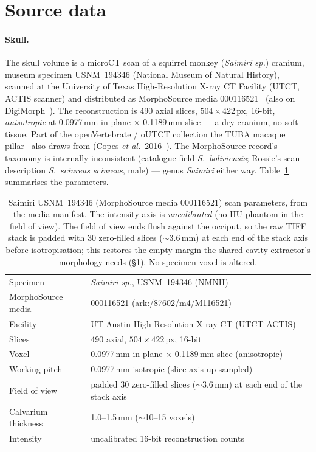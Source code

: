 \documentclass{compactarticle}
\providecommand{\br}{\toprule}
\providecommand{\mr}{\midrule}
\begin{document}
\section{Source data}
\label{sec:source}

\paragraph{Skull.} The skull volume is a microCT scan of a squirrel
monkey (\emph{Saimiri sp.}) cranium, museum specimen USNM~194346
(National Museum of Natural History), scanned at the University of Texas
High-Resolution X-ray CT Facility (UTCT, ACTIS scanner) and distributed
as MorphoSource media 000116521~\cite{morphosource-saimiri} (also on
DigiMorph~\cite{digimorph-saimiri}). The reconstruction is 490 axial
slices, $504\times422$\,px, 16-bit, \emph{anisotropic} at 0.0977\,mm
in-plane $\times$ 0.1189\,mm slice --- a dry cranium, no soft tissue.
Part of the openVertebrate / oUTCT collection the TUBA macaque
pillar~\cite{tuba-macaque} also draws from (Copes \emph{et
al.}\ 2016~\cite{copes-2016}). The MorphoSource record's taxonomy is
internally inconsistent (catalogue field \emph{S.~boliviensis};
Rossie's scan description \emph{S.~sciureus sciureus}, male) --- genus
\emph{Saimiri} either way. Table~\ref{tab:scan-params} summarises the
parameters.

\begin{table}[H]
\centering
\caption{Saimiri USNM~194346 (MorphoSource media 000116521) scan
         parameters, from the media manifest. The intensity axis is
         \emph{uncalibrated} (no HU phantom in the field of view).
         The field of view ends flush against the occiput, so the
         raw TIFF stack is padded with 30 zero-filled slices
         ($\sim$3.6\,mm) at each end of the stack axis before
         isotropisation; this restores the empty margin the shared
         cavity extractor's morphology needs (\S\ref{sec:source}).
         No specimen voxel is altered.}
\label{tab:scan-params}
\small
\begin{tabular}{ll}
\br
Specimen & \emph{Saimiri sp.}, USNM~194346 (NMNH) \\
MorphoSource media & 000116521 (ark:/87602/m4/M116521) \\
Facility & UT Austin High-Resolution X-ray CT (UTCT ACTIS) \\
Slices & 490 axial, $504\times422$\,px, 16-bit \\
Voxel & 0.0977\,mm in-plane $\times$ 0.1189\,mm slice (anisotropic) \\
Working pitch & 0.0977\,mm isotropic (slice axis up-sampled) \\
Field of view & padded 30 zero-filled slices ($\sim$3.6\,mm) at each end of the stack axis \\
Calvarium thickness & 1.0--1.5\,mm ($\sim$10--15 voxels) \\
Intensity & uncalibrated 16-bit reconstruction counts \\
\mr
\end{tabular}
\end{table}
\end{document}
